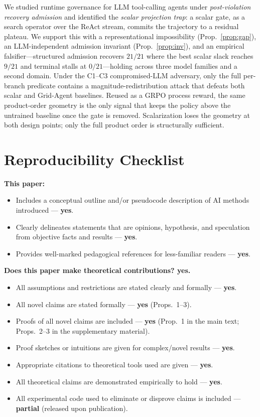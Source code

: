 \documentclass[letterpaper]{article} %
\theoremstyle{plain}
\begin{document}
We studied runtime governance for LLM tool-calling agents under \emph{post-violation recovery admission} and identified the \emph{scalar projection trap}: a scalar gate, as a search operator over the ReAct stream, commits the trajectory to a residual plateau. We support this with a representational impossibility (Prop.~\ref{prop:gap}), an LLM-independent admission invariant (Prop.~\ref{prop:inv}), and an empirical falsifier---structured admission recovers $21/21$ where the best scalar slack reaches $9/21$ and terminal stalls at $0/21$---holding across three model families and a second domain. Under the C1--C3 compromised-LLM adversary, only the full per-branch predicate contains a magnitude-redistribution attack that defeats both scalar and Grid-Agent baselines. Reused as a GRPO process reward, the same product-order geometry is the only signal that keeps the policy above the untrained baseline once the gate is removed. Scalarization loses the geometry at both design points; only the full product order is structurally sufficient.



\appendix
\section{Reproducibility Checklist}

\noindent\textbf{This paper:}
\begin{itemize}\setlength{\itemsep}{0pt}
\item Includes a conceptual outline and/or pseudocode description of AI methods introduced --- \textbf{yes}.
\item Clearly delineates statements that are opinions, hypothesis, and speculation from objective facts and results --- \textbf{yes}.
\item Provides well-marked pedagogical references for less-familiar readers --- \textbf{yes}.
\end{itemize}

\noindent\textbf{Does this paper make theoretical contributions? yes.}
\begin{itemize}\setlength{\itemsep}{0pt}
\item All assumptions and restrictions are stated clearly and formally --- \textbf{yes}.
\item All novel claims are stated formally --- \textbf{yes} (Props.~1--3).
\item Proofs of all novel claims are included --- \textbf{yes} (Prop.~1 in the main text; Props.~2--3 in the supplementary material).
\item Proof sketches or intuitions are given for complex/novel results --- \textbf{yes}.
\item Appropriate citations to theoretical tools used are given --- \textbf{yes}.
\item All theoretical claims are demonstrated empirically to hold --- \textbf{yes}.
\item All experimental code used to eliminate or disprove claims is included --- \textbf{partial} (released upon publication).
\end{itemize}
\end{document}
